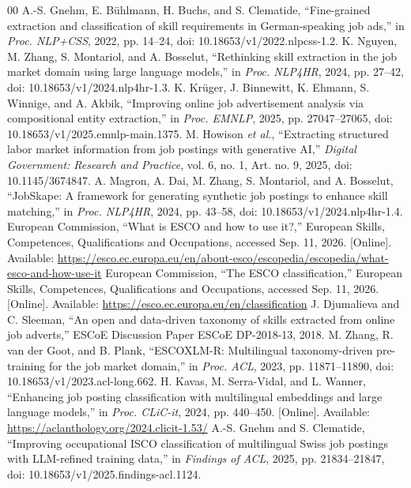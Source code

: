 \documentclass[conference]{IEEEtran}
\begin{document}
\begin{thebibliography}{00}
 A.-S. Gnehm, E. B\"uhlmann, H. Buchs, and S. Clematide, ``Fine-grained extraction and classification of skill requirements in German-speaking job ads,'' in \emph{Proc. NLP+CSS}, 2022, pp. 14--24, doi: 10.18653/v1/2022.nlpcss-1.2.
 K. Nguyen, M. Zhang, S. Montariol, and A. Bosselut, ``Rethinking skill extraction in the job market domain using large language models,'' in \emph{Proc. NLP4HR}, 2024, pp. 27--42, doi: 10.18653/v1/2024.nlp4hr-1.3.
 K. Kr\"uger, J. Binnewitt, K. Ehmann, S. Winnige, and A. Akbik, ``Improving online job advertisement analysis via compositional entity extraction,'' in \emph{Proc. EMNLP}, 2025, pp. 27047--27065, doi: 10.18653/v1/2025.emnlp-main.1375.
 M. Howison \emph{et al.}, ``Extracting structured labor market information from job postings with generative AI,'' \emph{Digital Government: Research and Practice}, vol. 6, no. 1, Art. no. 9, 2025, doi: 10.1145/3674847.
 A. Magron, A. Dai, M. Zhang, S. Montariol, and A. Bosselut, ``JobSkape: A framework for generating synthetic job postings to enhance skill matching,'' in \emph{Proc. NLP4HR}, 2024, pp. 43--58, doi: 10.18653/v1/2024.nlp4hr-1.4.
 European Commission, ``What is ESCO and how to use it?,'' European Skills, Competences, Qualifications and Occupations, accessed Sep. 11, 2026. [Online]. Available: \url{https://esco.ec.europa.eu/en/about-esco/escopedia/escopedia/what-esco-and-how-use-it}
 European Commission, ``The ESCO classification,'' European Skills, Competences, Qualifications and Occupations, accessed Sep. 11, 2026. [Online]. Available: \url{https://esco.ec.europa.eu/en/classification}
 J. Djumalieva and C. Sleeman, ``An open and data-driven taxonomy of skills extracted from online job adverts,'' ESCoE Discussion Paper ESCoE DP-2018-13, 2018.
 M. Zhang, R. van der Goot, and B. Plank, ``ESCOXLM-R: Multilingual taxonomy-driven pre-training for the job market domain,'' in \emph{Proc. ACL}, 2023, pp. 11871--11890, doi: 10.18653/v1/2023.acl-long.662.
 H. Kavas, M. Serra-Vidal, and L. Wanner, ``Enhancing job posting classification with multilingual embeddings and large language models,'' in \emph{Proc. CLiC-it}, 2024, pp. 440--450. [Online]. Available: \url{https://aclanthology.org/2024.clicit-1.53/}
 A.-S. Gnehm and S. Clematide, ``Improving occupational ISCO classification of multilingual Swiss job postings with LLM-refined training data,'' in \emph{Findings of ACL}, 2025, pp. 21834--21847, doi: 10.18653/v1/2025.findings-acl.1124.

\end{thebibliography}
\end{document}
